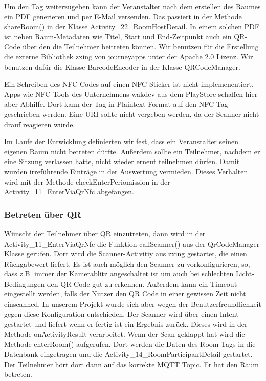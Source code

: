 Um den Tag weiterzugeben kann der Veranstalter nach dem erstellen des Raumes ein PDF generieren und per E-Mail versenden. 
Das passiert in der Methode shareRoom() in der Klasse Activity\_22\_RoomHostDetail. 
In einem solchen PDF ist neben Raum-Metadaten wie Titel, Start und End-Zeitpunkt auch ein QR-Code über den die Teilnehmer beitreten können. 
Wir benutzen für die Erstellung die externe Bibliothek zxing von journeyapps unter der Apache 2.0 Lizenz. Wir benutzen dafür die Klasse BarcodeEncoder in der Klasse QRCodeManager.

Ein Schreiben des NFC Codes auf einen NFC Sticker ist nicht implemenentiert.
 Apps wie NFC Tools des Unternehmens wakdev aus dem PlayStore schaffen hier aber Abhilfe. Dort kann der Tag in Plaintext-Format auf den NFC Tag geschrieben werden.
Eine URI sollte nicht vergeben werden, da der Scanner nicht drauf reagieren würde.

Im Laufe der Entwicklung definierten wir fest, dass ein Veranstalter seinen eigenen Raum nicht betreten dürfte. Außerdem sollte ein Teilnehmer, nachdem er eine Sitzung verlassen hatte, nicht wieder erneut teilnehmen dürfen. Damit wurden irreführende Einträge in der Auswertung vermieden. Dieses Verhalten wird mit der Methode checkEnterPeriomission in der Activity\_11\_EnterViaQrNfc abgefangen.
\subsubsection*{Betreten über QR}
\label{subsec: Betreten über QR}
Wünscht der Teilnehmer über QR einzutreten, dann wird in der Activity\_11\_EnterViaQrNfc die Funktion callScanner() aus der QrCodeManager-Klasse gerufen. Dort wird die Scanner-Activitiy aus zxing gestartet, die einen Rückgabewert liefert. Es ist auch möglich den Scanner zu vorkonfigurieren, so, dass z.B. immer der Kamerablitz angeschaltet ist um auch bei schlechten Licht-Bedingungen den QR-Code gut zu erkennen. 
Außerdem kann ein Timeout eingestellt werden, falls der Nutzer den QR Code in einer gewissen Zeit nicht einscanned.
In unserem Projekt wurde sich aber wegen der Benutzerfreundlichkeit gegen diese Konfiguration entschieden.
Der Scanner wird über einen Intent gestartet und liefert wenn er fertig ist ein Ergebnis zurück.
Dieses wird in der Methode onActivityResult verarbeitet. Wenn der Scan geklappt hat wird die Methode enterRoom() aufgerufen. Dort werden die Daten des Room-Tags in die Datenbank eingetragen und die Activity\_14\_RoomParticipantDetail gestartet. Der Teilnehmer hört dort dann auf das korrekte MQTT Topic. Er hat den Raum betreten.
